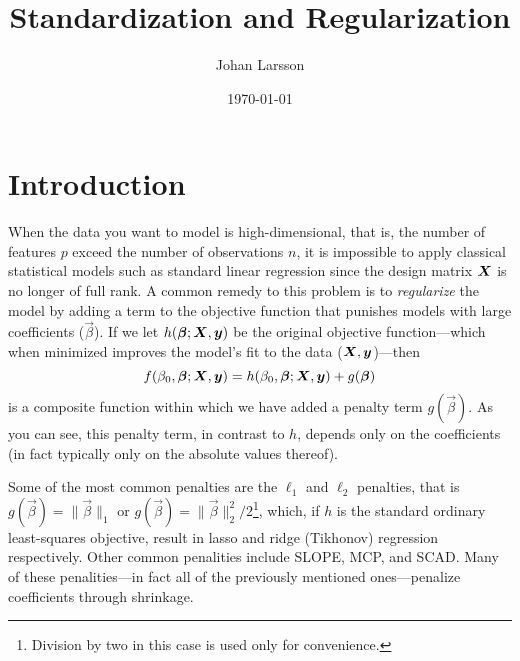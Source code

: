 


\title{Standardization and Regularization}
\author[1,*]{Johan Larsson}
\date{\today}

% 



\maketitle

\section{Introduction}

When the data you want to model is high-dimensional, that is, the number of features \(p\) exceed the number of observations \(n\), it is impossible to apply classical statistical models such as standard linear regression since the design matrix \(\mat X\) is no longer of full rank. A common remedy to this problem is to \emph{regularize} the model by adding a term to the objective function that punishes models with large coefficients (\(\vec\beta\)). If we let \(h(\vec\beta; \mat X, \vec y)\) be the original objective function---which when minimized improves the model's fit to the data (\(\mat X, \vec y\))---then
\[
  f(\beta_0, \vec\beta; \mat X, \vec y) = h(\beta_0, \vec\beta; \mat X, \vec y) + g(\vec\beta)
\]
is a composite function within which we have added a penalty term \(g(\vec\beta)\). As you can see, this penalty term, in contrast to \(h\), depends only on the coefficients (in fact typically only on the absolute values thereof).

Some of the most common penalties are the \(\ell_1\) and \(\ell_2\) penalties, that is \(g(\vec\beta) = \lVert \vec\beta \rVert_1\) or \(g(\vec\beta) = \lVert \vec\beta \rVert_2^2/2\)\footnote{Division by two in this case is used only for convenience.}, which, if \(h\) is the standard ordinary least-squares objective, result in lasso and ridge (Tikhonov) regression respectively. Other common penalities include SLOPE, MCP, and SCAD. Many of these penalities---in fact all of the previously mentioned ones---penalize coefficients through shrinkage.

